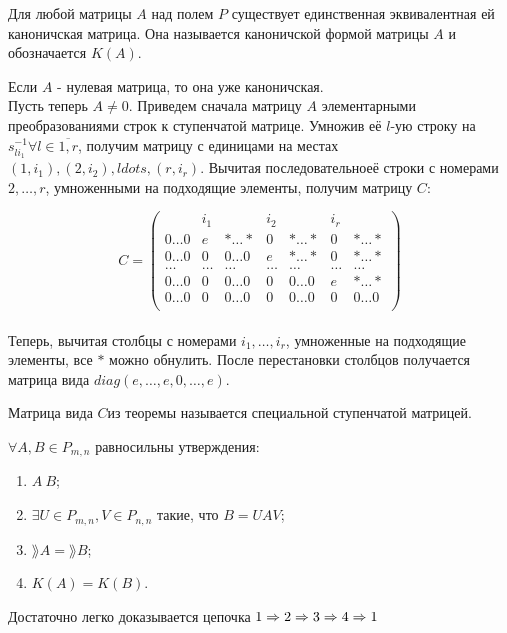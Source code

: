\begin{proofs}
	Для любой матрицы $A$ над полем $P$ существует единственная эквивалентная ей каноничская матрица.
  Она называется каноничской формой матрицы $A$ и обозначается $K(A)$.
	\begin{dokvo}
    Если $A$ - нулевая матрица, то она уже каноничская.\\
    Пусть теперь $A \neq 0$. Приведем сначала матрицу $A$ элементарными преобразованиями строк к ступенчатой матрице.
    Умножив её $l$-ую строку на $s^{-1}_{li_1} \forall l \in \overline{1, r}$, получим матрицу
    с единицами на местах $(1, i_1), (2, i_2), ldots, (r, i_r)$. Вычитая последовательноеё строки с номерами $2, \ldots, r$, умноженными
    на подходящие элементы, получим матрицу $C$:


    $$C =
    \begin{pmatrix}
      & i_1 & & i_2 & & i_r & \\
      0\ldots0 & e & *\ldots* & 0 & *\ldots* & 0 & *\ldots* \\
      0\ldots0 & 0 & 0\ldots0 & e & *\ldots* & 0 & *\ldots* \\
      \ldots & \ldots & \ldots & \ldots & \ldots & \ldots & \ldots \\
      0\ldots0 & 0 & 0\ldots0 & 0 & 0\ldots0 & e & *\ldots* \\
      0\ldots0 & 0 & 0\ldots0 & 0 & 0\ldots0 & 0 & 0\ldots0 \\
    \end{pmatrix}$$\\

    Теперь, вычитая столбцы с номерами $i_1, \ldots, i_r$, умноженные на подходящие элементы,
    все $*$ можно обнулить. После перестановки столбцов получается матрица вида $diag(e, \ldots, e, 0, \ldots, e)$.
	\end{dokvo}
\end{proofs}

\begin{defs}
	Матрица вида $C$из теоремы называется специальной ступенчатой матрицей.
\end{defs}

\begin{proofs}
	$\forall A,B \in P_{m,n}$ равносильны утверждения:
  \begin{enumerate}
  	\item $A~B$;
  	\item $\exists U \in P_{m,n}, V \in P_{n,n}$ такие, что $B = UAV$;
    \item $\rang{A} = \rang{B}$;
    \item $K(A) = K(B)$.
  \end{enumerate}
	\begin{dokvo}
    Достаточно легко доказывается цепочка $1 \Rightarrow 2 \Rightarrow 3 \Rightarrow 4 \Rightarrow 1$
	\end{dokvo}
\end{proofs}
\newpage
